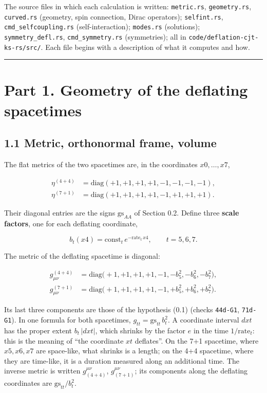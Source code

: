 \documentclass[
  10pt,
]{article}
\begin{document}
The source files in which each calculation is written:
\texttt{metric.rs}, \texttt{geometry.rs}, \texttt{curved.rs} (geometry,
spin connection, Dirac operators); \texttt{selfint.rs},
\texttt{cmd\_selfcoupling.rs} (self-interaction); \texttt{modes.rs}
(solutions); \texttt{symmetry\_defl.rs}, \texttt{cmd\_symmetry.rs}
(symmetries); all in \texttt{code/deflation-cjt-ks-rs/src/}. Each file
begins with a description of what it computes and how.

\begin{center}\rule{0.5\linewidth}{0.5pt}\end{center}

\hypertarget{part-1.-geometry-of-the-deflating-spacetimes}{%
\section{Part 1. Geometry of the deflating
spacetimes}\label{part-1.-geometry-of-the-deflating-spacetimes}}

\hypertarget{metric-orthonormal-frame-volume}{%
\subsection{1.1 Metric, orthonormal frame,
volume}\label{metric-orthonormal-frame-volume}}

The flat metrics of the two spacetimes are, in the coordinates
\(x0,\dots,x7\),

\[\begin{aligned}
\eta^{(4+4)}&=\mathrm{diag}(+1,+1,+1,+1,-1,-1,-1,-1),\\
\eta^{(7+1)}&=\mathrm{diag}(+1,+1,+1,+1,-1,+1,+1,+1).
\end{aligned}\tag{1.1}\]

Their diagonal entries are the signs \(\mathrm{gs}_{AA}\) of Section
0.2. Define three \textbf{scale factors}, one for each deflating
coordinate,

\[b_t(x4)=\mathrm{const}_t\,e^{-\mathrm{rate}_t\,x4},\qquad t=5,6,7.\tag{1.2}\]

The metric of the deflating spacetime is diagonal:

\[\begin{aligned}
g^{(4+4)}_{\mu\nu}&=\mathrm{diag}\big(+1,+1,+1,+1,-1,-b_5^2,-b_6^2,-b_7^2\big),\\
g^{(7+1)}_{\mu\nu}&=\mathrm{diag}\big(+1,+1,+1,+1,-1,+b_5^2,+b_6^2,+b_7^2\big).
\end{aligned}\tag{1.3}\]

Its last three components are those of the hypothesis (0.1) (checks
\texttt{44d-G1}, \texttt{71d-G1}). In one formula for both spacetimes,
\(g_{tt}=\mathrm{gs}_{tt}\,b_t^2\). A coordinate interval \(dxt\) has
the proper extent \(b_t\,|dxt|\), which shrinks by the factor \(e\) in
the time \(1/\mathrm{rate}_t\): this is the meaning of ``the coordinate
\(xt\) deflates''. On the 7+1 spacetime, where \(x5,x6,x7\) are
space-like, what shrinks is a length; on the 4+4 spacetime, where they
are time-like, it is a duration measured along an additional time. The
inverse metric is written \(g_{(4+4)}^{\mu\nu}\),
\(g_{(7+1)}^{\mu\nu}\); its components along the deflating coordinates
are \(\mathrm{gs}_{tt}/b_t^2\).
\end{document}
